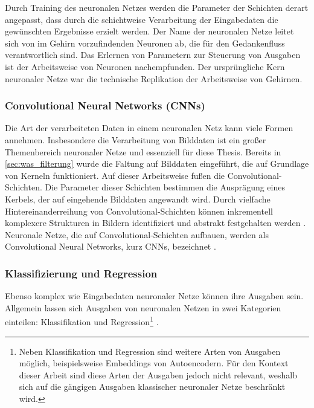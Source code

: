 Durch Training des neuronalen Netzes werden die Parameter der Schichten derart angepasst, dass durch die schichtweise Verarbeitung der Eingabedaten die gewünschten Ergebnisse erzielt werden. Der Name der neuronalen Netze leitet sich von im Gehirn vorzufindenden Neuronen ab, die für den Gedankenfluss verantwortlich sind. Das Erlernen von Parametern zur Steuerung von Ausgaben ist der Arbeitsweise von Neuronen nachempfunden. Der ursprüngliche Kern neuronaler Netze war die technische Replikation der Arbeitsweise von Gehirnen.

\subsubsection{Convolutional Neural Networks (CNNs)}
\label{sec:cnns}

Die Art der verarbeiteten Daten in einem neuronalen Netz kann viele Formen annehmen. Insbesondere die Verarbeitung von Bilddaten ist ein großer Themenbereich neuronaler Netze und essenziell für diese Thesis. Bereits in \autoref{sec:was_filterung} wurde die Faltung auf Bilddaten eingeführt, die auf Grundlage von Kerneln funktioniert. Auf dieser Arbeitsweise fußen die Convolutional-Schichten. Die Parameter dieser Schichten bestimmen die Ausprägung eines Kerbels, der auf eingehende Bilddaten angewandt wird. Durch vielfache Hintereinanderreihung von Convolutional-Schichten können inkrementell komplexere Strukturen in Bildern identifiziert und abstrakt festgehalten werden \cite{alexnet}. Neuronale Netze, die auf Convolutional-Schichten aufbauen, werden als Convolutional Neural Networks, kurz CNNs, bezeichnet \cite{cv_general}.

\subsubsection{Klassifizierung und Regression}
\label{sec:klassifizierung_regression}

Ebenso komplex wie Eingabedaten neuronaler Netze können ihre Ausgaben sein. Allgemein lassen sich Ausgaben von neuronalen Netzen in zwei Kategorien einteilen: Klassifikation und Regression\footnote{Neben Klassifikation und Regression sind weitere Arten von Ausgaben möglich, beispielsweise Embeddings von Autoencodern. Für den Kontext dieser Arbeit sind diese Arten der Ausgaben jedoch nicht relevant, weshalb sich auf die gängigen Ausgaben klassischer neuronaler Netze beschränkt wird.} \cite{nn_terminology,cv_general}.

